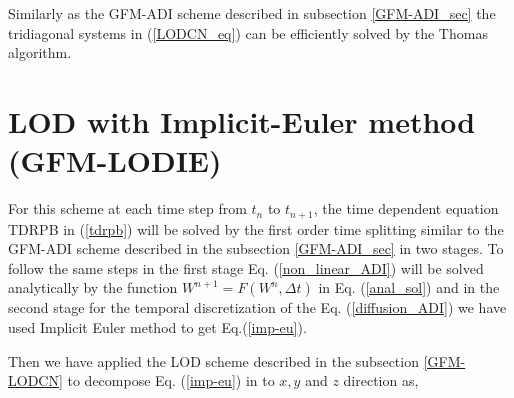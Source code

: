 Similarly as the GFM-ADI scheme described in subsection \ref{GFM-ADI_sec} the tridiagonal systems in (\ref{LODCN_eq}) can be efficiently solved by the Thomas algorithm. 



\section{LOD with Implicit-Euler method (GFM-LODIE)}

For this scheme at each time step from $t_n$ to $t_{n+1}$, the time dependent equation TDRPB in  (\ref{tdrpb}) will be solved by the first order time splitting  similar to the GFM-ADI scheme described in the subsection \ref{GFM-ADI_sec} in two stages. To follow the same steps in the first stage Eq. (\ref{non_linear_ADI}) will be solved analytically by the function $W^{n+1}=F(W^n,\Delta t)$ in Eq. (\ref{anal_sol}) and in the second stage for the temporal discretization of the Eq.  (\ref{diffusion_ADI}) we have used Implicit Euler method to get Eq.(\ref{imp-eu}). 
 
 Then we have applied the LOD scheme described in the subsection \ref{GFM-LODCN} to decompose Eq. (\ref{imp-eu})  in to $x,y$ and $z$ direction as, 
 
